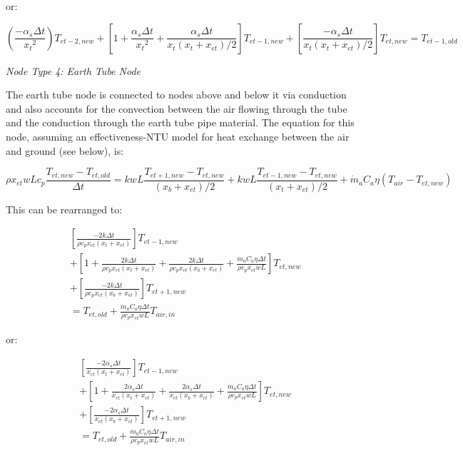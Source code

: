 or:

\begin{equation}
(\frac{-\alpha_s \Delta t}{{x_t}^2}) T_{et-2,new} + [1 + \frac{\alpha_s \Delta t}{{x_t}^2} + \frac{\alpha_s \Delta t}{x_t (x_t+x_{et})/2}] T_{et-1,new} + [\frac{-\alpha_s \Delta t}{x_t (x_t+x_{et})/2}] T_{et,new} = T_{et-1,old}
\end{equation}


\emph{\textit{Node Type 4: Earth Tube Node}}

The earth tube node is connected to nodes above and below it via conduction and also accounts for the convection between the air flowing through the tube and the conduction through the earth tube pipe material.  The equation for this node, assuming an effectiveness-NTU model for heat exchange between the air and ground (see below), is:

\begin{equation}
\rho x_{et} w L c_p \frac{T_{et,new} - T_{et,old}}{\Delta t} = k w L \frac{T_{et+1,new}-T_{et,new}}{(x_b + x_{et})/2} + k w L \frac{T_{et-1,new}-T_{et,new}}{(x_t + x_{et})/2} + {\dot m_a}{C_a} \eta (T_{air} - T_{et,new})
\end{equation}

This can be rearranged to:

\begin{equation}
\begin{split}
[ \frac{-2k \Delta t}{\rho c_p x_{et} (x_t + x_{et})} ] T_{et-1,new} \\
 + [ 1 + \frac{2 k \Delta t}{\rho c_p x_{et} (x_t + x_{et})} + \frac{2 k \Delta t}{\rho c_p x_{et} (x_b+x_{et})} + \frac{\dot m_a {C_a} \eta \Delta t}{\rho c_p x_{et} w L} ] T_{et,new} \\
 + [ \frac{-2k \Delta t}{\rho c_p x_{et} (x_b + x_{et})} ] T_{et+1,new} \\
 = T_{et,old} + \frac{\dot m_a {C_a} \eta \Delta t}{\rho c_p x_{et} w L} T_{air,in}
\end{split}
\end{equation}

or:

\begin{equation}
\begin{split}
[ \frac{-2 \alpha_s \Delta t}{x_{et} (x_t + x_{et})} ] T_{et-1,new} \\
 + [ 1 + \frac{2 \alpha_s \Delta t}{x_{et} (x_t + x_{et})} + \frac{2 \alpha_s \Delta t}{x_{et} (x_b+x_{et})} + \frac{\dot m_a {C_a} \eta \Delta t}{\rho c_p x_{et} w L} ] T_{et,new} \\
 + [ \frac{-2 \alpha_s \Delta t}{x_{et} (x_b + x_{et})} ] T_{et+1,new} \\
 = T_{et,old} + \frac{\dot m_a {C_a} \eta \Delta t}{\rho c_p x_{et} w L} T_{air,in}
\end{split}
\end{equation}


